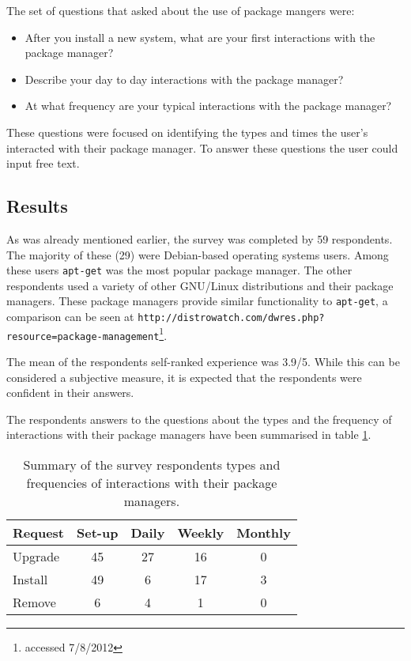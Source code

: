 The set of questions that asked about the use of package mangers were:
\begin{itemize}
  \item After you install a new system, what are your first interactions with the package manager?
  \item Describe your day to day interactions with the package manager?
  \item At what frequency are your typical interactions with the package manager?
\end{itemize}
These questions were focused on identifying the types and times the user's interacted with their package manager.
To answer these questions the user could input free text.

\subsection{Results}
As was already mentioned earlier, the survey was completed by 59 respondents.
The majority of these (29) were Debian-based operating systems users.
Among these users \texttt{apt-get} was the most popular package manager.
The other respondents used a variety of other GNU/Linux distributions and their package managers.
These package managers provide similar functionality to \texttt{apt-get}, a comparison can be seen at \texttt{http://distrowatch.com/dwres.php?resource=package-management}\footnote{accessed 7/8/2012}. 

The mean of the respondents self-ranked experience was 3.9/5.
While this can be considered a subjective measure, it is expected that the respondents were confident in their answers. 

The respondents answers to the questions about the types and the frequency of interactions with their package managers have been summarised in table \ref{strat.tblaction}.
\begin{table}[htp]
\centering
\begin{tabular}{| l | c | c | c | c |} \hline
\textbf{Request} & \textbf{Set-up} & \textbf{Daily} & \textbf{Weekly} & \textbf{Monthly} \\ \hline
Upgrade  & 45 & 27 & 16 & 0 \\
Install & 49 & 6 & 17 & 3 \\
Remove & 6 & 4 & 1 & 0\\ \hline
\end{tabular}
\caption{Summary of the survey respondents types and frequencies of interactions with their package managers.}
\label{strat.tblaction}
\end{table}

